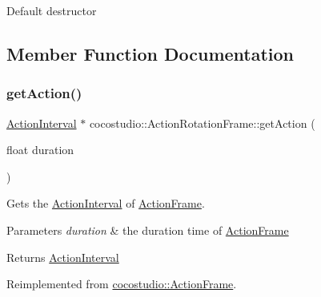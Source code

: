 Default destructor 

\subsection{Member Function Documentation}
\mbox{\label{classcocostudio_1_1ActionRotationFrame_af44596d9558e7b904a77b1ca504e74b5}} 
\subsubsection{\texorpdfstring{get\+Action()}{getAction()}\hspace{0.1cm}{\footnotesize\ttfamily [1/4]}}
{\footnotesize\ttfamily \hyperlink{classActionInterval}{Action\+Interval} $\ast$ cocostudio\+::\+Action\+Rotation\+Frame\+::get\+Action (\begin{DoxyParamCaption}\item[{float}]{duration }\end{DoxyParamCaption})\hspace{0.3cm}{\ttfamily [virtual]}}

Gets the \hyperlink{classActionInterval}{Action\+Interval} of \hyperlink{classcocostudio_1_1ActionFrame}{Action\+Frame}.


\begin{DoxyParams}{Parameters}
{\em duration} & the duration time of \hyperlink{classcocostudio_1_1ActionFrame}{Action\+Frame}\\
\hline
\end{DoxyParams}
\begin{DoxyReturn}{Returns}
\hyperlink{classActionInterval}{Action\+Interval} 
\end{DoxyReturn}


Reimplemented from \hyperlink{classcocostudio_1_1ActionFrame_a375216a44f6643d5e771299b1236dc51}{cocostudio\+::\+Action\+Frame}.

\mbox{\label{classcocostudio_1_1ActionRotationFrame_a6ca8b34044106cf7e71dc9fe301d5b5a}} 
